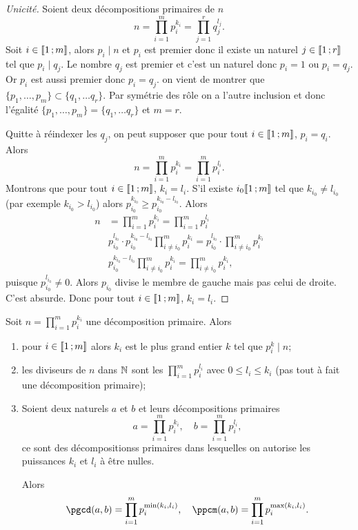 \begin{proof}[Unicité]
  Soient deux décompositions primaires de $n$
  \begin{equation}
    n=\prod_{i=1}^m p_i^{k_i} = \prod_{j=1}^r q_j^{l_j}.
  \end{equation}
  Soit $i \in \mathopen{\llbracket}1\mathclose{}\mathpunct{};m\mathclose{\rrbracket}$, alors $p_i \mid n$ et $p_i$ est premier donc il existe un naturel $j \in \mathopen{\llbracket}1\mathclose{}\mathpunct{};r\mathclose{\rrbracket}$ tel que $p_i \mid q_j$. Le nombre $q_j$ est premier et c'est un naturel donc $p_i=1$ ou $p_i=q_j$. Or $p_i$ est aussi premier donc $p_i=q_j$. on vient de montrer que $\{p_1, \ldots, p_m\} \subset \{q_1, \ldots q_r\}$. Par symétrie des rôle on a l'autre inclusion et donc l'égalité $\{p_1, \ldots, p_m\} = \{q_1, \ldots q_r\}$ et $m=r$.

  Quitte à réindexer les $q_j$, on peut supposer que pour tout $i \in \mathopen{\llbracket}1\mathclose{}\mathpunct{};m\mathclose{\rrbracket}$, $p_i=q_i$. Alors
  \begin{equation}
    n=\prod_{i=1}^m p_i^{k_i} = \prod_{i=1}^m p_i^{l_i}.
  \end{equation}
  Montrons que pour tout $i \in \mathopen{\llbracket}1\mathclose{}\mathpunct{};m\mathclose{\rrbracket}$, $k_i=l_i$. S'il existe $i_0 \mathopen{\llbracket}1\mathclose{}\mathpunct{};m\mathclose{\rrbracket}$ tel que $k_{i_0} \neq l_{i_0}$ (par exemple $k_{i_0} > l_{i_0}$) alors $p_{i_0}^{k_{i_0}} \geq p_{i_0}^{k_{i_0}-l_{i_0}}$. Alors
\begin{align}
    n&=\prod_{i=1}^m p_i^{k_i} = \prod_{i=1}^m p_i^{l_i} \\
    &p_{i_0}^{l_{i_0}} \cdot p_{i_0}^{k_{i_0}-l_{i_0}} \prod_{i \neq i_0}^m p_i^{k_i} = p_{i_0}^{l_{i_0}} \cdot \prod_{i \neq i_0}^m p_i^{k_i}\\
    &p_{i_0}^{k_{i_0}-l_{i_0}} \prod_{i \neq i_0}^m p_i^{k_i} =\prod_{i \neq i_0}^m p_i^{k_i},
  \end{align}
  puisque $p_{i_0}^{l_{i_0}} \neq 0$. Alors $p_{i_0}$ divise le membre de gauche mais pas celui de droite. C'est absurde. Donc pour tout $i \in \mathopen{\llbracket}1\mathclose{}\mathpunct{};m\mathclose{\rrbracket}$,  $k_i=l_i$.
\end{proof}
\begin{corth}
  Soit $n=\prod_{i=1}^m p_i^{k_i}$ une décomposition primaire. Alors
  \begin{enumerate}
  \item pour $i \in \mathopen{\llbracket}1\mathclose{}\mathpunct{};m\mathclose{\rrbracket}$ alors $k_i$ est le plus grand entier $k$ tel que $p_i^k \mid n$;
  \item les diviseurs de $n$ dans $\mathbb{N}$ sont les $\prod_{i=1}^m p_i^{l_i}$ avec $0 \leq l_i \leq k_i$ (pas tout à fait une décomposition primaire);
  \item Soient deux naturels $a$ et $b$ et leurs décompositions primaires
    \begin{equation}
      a=\prod_{i=1}^m p_i^{k_i}, \quad b=\prod_{i=1}^m p_i^{l_i},
    \end{equation}
    ce sont des décompositionss primaires dans lesquelles on autorise les puissances $k_i$ et $l_i$ à être nulles. 

    Alors
    \begin{equation}
      \pgcd(a,b) = \prod_{i=1}^m p_i^{\min(k_i,l_i)}, \quad \ppcm(a,b) = \prod_{i=1}^m p_i^{\max(k_i,l_i)}.
    \end{equation}
  \end{enumerate}
\end{corth}
